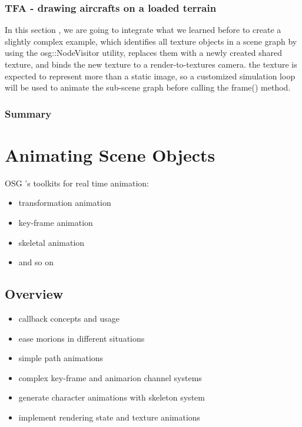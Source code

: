 \documentclass[a4paper,12pt]{book}
\begin{document}
\subsection{TFA - drawing aircrafts on a loaded terrain}
In this section , we are going to integrate what we learned before to create a slightly complex example, which identifies all texture objects in a scene graph by using the osg::NodeVisitor utility, replaces them with a newly created shared texture, and binds the new texture to a render-to-textures camera. the texture is expected to represent more than a static image, so a customized simulation loop will be used to animate the sub-scene graph before calling the frame() method.

\subsection{Summary}

\chapter{Animating Scene Objects}

OSG 's toolkits for real time animation:
\begin{itemize}
\item transformation animation
\item key-frame animation
\item skeletal animation
\item and so on
\end{itemize}

\section{Overview}
\begin{itemize}
\item callback concepts and usage
\item ease morions in different situations
\item simple path animations
\item complex key-frame and animarion channel systems
\item generate character animations with skeleton system
\item implement rendering state and texture animations
\end{itemize}
\end{document}
